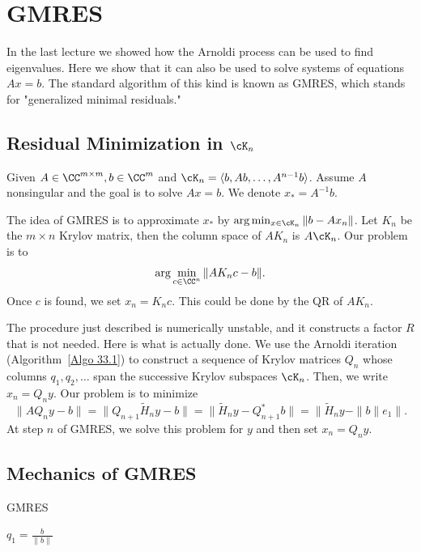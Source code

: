 \chapter{GMRES}

In the last lecture we showed how the Arnoldi process can be used to find eigenvalues. Here we show that it can also be used to solve systems of equations $A x=b$. The standard algorithm of this kind is known as GMRES, which stands for "generalized minimal residuals."

\section{Residual Minimization in $ \cK_n $} 
Given $ A \in \CC^{m\times m},b \in \CC^{m} $ and $ \cK_n = \langle b, Ab, \ldots ,A^{n-1}b \rangle  $. Assume $ A $ nonsingular and the goal is to solve $ Ax=b $. We denote $ x_* = A^{-1}b $.  

The idea of GMRES is to approximate $ x_* $ by $ \arg\min_{x\in \cK_n}  \|b-Ax_n\| $. Let $ K_n $ be the $ m\times n $ Krylov matrix, then the column space of $ AK_n $ is $ A\cK_n $. Our problem is to 
\[
    \arg \min_{c\in \CC^{n}} \|A K_n c- b\|. 
\]
Once $ c $ is found, we set $ x_n = K_n c $. This could be done by the QR of $ AK_n $.  

The procedure just described is numerically unstable, and it constructs a factor $ R $ that is not needed. Here is what is actually done. We use the Arnoldi iteration (Algorithm~\ref{Algo 33.1}) to construct a sequence of Krylov matrices $ Q_n $ whose columns $ q_1,q_2,\ldots  $ span the successive Krylov subspaces $ \cK_n $. Then, we write $ x_n = Q_n y $. Our problem is to minimize 
\[
    \|AQ_n y -b\| = \|Q_{n+1} \tilde H_n y - b \|  = \|\tilde H_n y - Q_{n+1}^* b\|= \|\tilde H_n y - \|b\| e_1 \|. 
\]
At step $ n $ of GMRES, we solve this problem for $ y $ and then set $ x_n =Q_ny $. 

\section{Mechanics of GMRES} 
\begin{algorithm}[H]
    \caption{GMRES}
    \label{Algo 35.1}
    $ q_1 = \frac{b}{\|b\|} $\; 
\end{algorithm}
 
